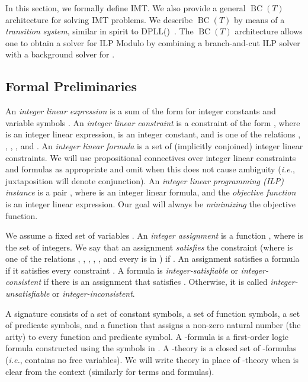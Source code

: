 \documentclass{llncs}
\newcommand{\comment}[1]{}
\newcommand{\ie}[0]{\emph{i.e.}, }
\newcommand{\bct}[0]{\ensuremath{\operatorname{BC}(T)}}
\newcommand{\dpllt}[0]{DPLL()}
\begin{document}
In this section, we formally define IMT. We also provide a general
\bct{} architecture for solving IMT problems. We describe \bct{} by
means of a \emph{transition system}, similar in spirit to
\dpllt{}~\cite{dpllt}. The \bct{} architecture allows one to obtain a
solver for ILP Modulo  by combining a branch-and-cut ILP solver
with a background solver for .

\subsection{Formal Preliminaries}
\label{sec:def}

\comment{We assume a fixed set of variable symbols .}

An \emph{integer linear expression} is a sum of the form  for integer constants  and variable symbols
. An \emph{integer linear constraint} is a constraint of the form
, where  is an integer linear expression,  is an
integer constant, and  is one of the relations , ,
, , and . An \emph{integer linear formula} is a set of
(implicitly conjoined) integer linear constraints. We will use
propositional connectives over integer linear constraints and formulas
as appropriate and omit  when this does not cause ambiguity
(\ie juxtaposition will denote conjunction). An \emph{integer linear
  programming (ILP) instance} is a pair , where  is an
integer linear formula, and the \emph{objective function}  is an
integer linear expression. Our goal will always be \emph{minimizing}
the objective function.

We assume a fixed set of variables . An \emph{integer
  assignment}  is a function ,
where  is the set of integers. We say that an assignment
 \emph{satisfies} the constraint  (where  is one of the relations , ,
, , , and every  is in ) if .  An assignment  satisfies a formula 
if it satisfies every constraint .  A formula  is
\emph{integer-satisfiable} or \emph{integer-consistent} if there is an
assignment  that satisfies . Otherwise, it is called
\emph{integer-unsatisfiable} or \emph{integer-inconsistent}.

A signature  consists of a set  of constant symbols,
a set  of function symbols, a set  of predicate
symbols, and a function  that assigns a non-zero natural number (the arity) to
every function and predicate symbol. A -formula is a
first-order logic formula constructed using the symbols in .
A -theory  is a closed set of -formulas (\ie 
contains no free variables). We will write theory in place of
-theory when  is clear from the context (similarly for
terms and formulas).
\end{document}

